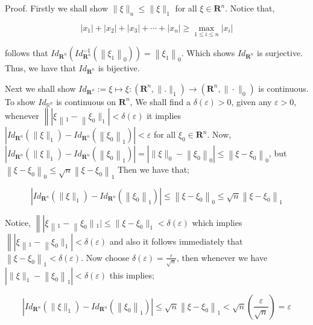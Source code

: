 \documentclass{article}
\begin{document}
Proof. Firstly we shall show $\|\xi\|_{u} \leq\|\xi\|_{1}$ for all $\xi \in \mathbf{R}^{n}$. Notice that,

$$
\left|x_{1}\right|+\left|x_{2}\right|+\left|x_{3}\right|+\cdots+\left|x_{n}\right| \geq \max _{1 \leq i \leq n}\left|x_{i}\right|
$$

follows that $I d_{\mathbf{R}^{n}}\left(I d_{\mathbf{R}^{n}}^{-1}\left(\left\|\xi_{1}\right\|_{0}\right)\right)=\left\|\xi_{1}\right\|_{0}$. Which shows $I d_{\mathbf{R}^{n}}$ is surjective. Thus, we have that $I d_{\mathbf{R}^{n}}$ is bijective.

Next we shall show $I d_{\mathbf{R}^{n}}:=\xi \mapsto \xi:\left(\mathbf{R}^{n},\|.\|_{1}\right) \longrightarrow\left(\mathbf{R}^{n},\|\cdot\|_{0}\right)$ is continuous. To show $I d_{\mathbb{R}^{n}}$ is continuous on $\mathbf{R}^{n}$, We shall find a $\delta(\varepsilon)>0$, given any $\varepsilon>0$, whenever $\left\|\left|\xi\left\|_{1}-\right\| \xi_{0} \|_{1}\right|<\delta(\varepsilon)\right.$ it implies $\left|I d_{\mathbf{R}^{n}}\left(\|\xi\|_{1}\right)-I d_{\mathbf{R}^{n}}\left(\left\|\xi_{0}\right\|_{1}\right)\right|<\varepsilon$ for all $\xi_{0} \in \mathbf{R}^{n}$. Now, $\left|I d_{\mathbf{R}^{n}}\left(\|\xi\|_{1}\right)-I d_{\mathbf{R}^{n}}\left(\left\|\xi_{0}\right\|_{1}\right)\right|=\left|\|\xi\|_{0}-\left\|\xi_{0}\right\|_{0}\right| \leq\left\|\xi-\xi_{0}\right\|_{0}$, but $\left\|\xi-\xi_{0}\right\|_{0} \leq \sqrt{n}\left\|\xi-\xi_{0}\right\|_{1}$
Then we have that;

$$
\left|I d_{\mathbf{R}^{n}}\left(\|\xi\|_{1}\right)-I d_{\mathbf{R}^{n}}\left(\left\|\xi_{0}\right\|_{1}\right)\right| \leq\left\|\xi-\xi_{0}\right\|_{0} \leq \sqrt{n}\left\|\xi-\xi_{0}\right\|_{1}
$$

Notice, $\left\|\left|\xi\left\|_{1}-\right\| \xi_{0}\left\|_{1} \mid \leq\right\| \xi-\xi_{0} \|_{1}<\delta(\varepsilon)\right.\right.$ which implies $\left\|\left|\xi\left\|_{1}-\right\| \xi_{0} \|_{1}\right|<\delta(\varepsilon)\right.$ and also it follows immediately that $\left\|\xi-\xi_{0}\right\|_{1}<\delta(\varepsilon)$. Now choose $\delta(\varepsilon)=\frac{\varepsilon}{\sqrt{n}}$, then whenever we have $\left|\|\xi\|_{1}-\left\|\xi_{0}\right\|_{1}\right|<\delta(\varepsilon)$ this implies;

$$
\left|I d_{\mathbf{R}^{n}}\left(\|\xi\|_{1}\right)-I d_{\mathbf{R}^{n}}\left(\left\|\xi_{0}\right\|_{1}\right)\right| \leq \sqrt{n}\left\|\xi-\xi_{0}\right\|_{1}<\sqrt{n}\left(\frac{\varepsilon}{\sqrt{n}}\right)=\varepsilon
$$
\end{document}
